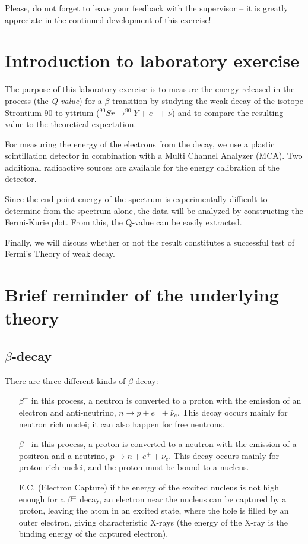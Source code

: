 \documentclass[a4,11pt, notitlepage]{article}
\begin{document}
Please, do not forget to leave your feedback with the supervisor -- it
is greatly appreciate in the continued development of this exercise!

\pagebreak
\section{Introduction to laboratory exercise}

The purpose of this laboratory exercise is to measure the energy
released in the process (the \textit{Q-value}) for a
$\beta$-transition by studying the weak decay of the isotope
Strontium-90 to yttrium ($^{90}Sr\rightarrow ^{90}Y + e^- + \bar{\nu}$) and to compare the
resulting value to the theoretical expectation. 

For measuring the energy of the electrons from the decay, we use a
plastic scintillation detector in combination with a Multi Channel
Analyzer (MCA). Two additional radioactive sources are available for
the energy calibration of the detector.

Since the end point energy of the spectrum is experimentally difficult
to determine from the spectrum alone, the data will be analyzed by
constructing the Fermi-Kurie plot. From this, the Q-value can be
easily extracted.

Finally, we will discuss whether or not the result constitutes a
successful test of Fermi's Theory of weak decay.

\section{Brief reminder of the underlying theory}
\subsection{$\beta$-decay}

There are three different kinds of $\beta$ decay:
\begin{itemize}
\item[$\beta^-$] in this process, a neutron is converted to a proton
  with the emission of an electron and anti-neutrino,
  $n\rightarrow p + e^- + \bar \nu_e$. This decay occurs mainly for
  neutron rich nuclei; it can also happen for free neutrons.
\item[$\beta^+$] in this process, a proton is converted to a neutron
  with the emission of a positron and a neutrino,
  $p\rightarrow n + e^+ + \nu_e$. This decay occurs mainly for
  proton rich nuclei, and the proton must be bound to a nucleus.
\item[E.C.] (Electron Capture) if the energy of the excited nucleus is
  not high enough for a $\beta^{\pm}$ decay, an electron near the
  nucleus can be captured by a proton, leaving the atom in an excited
  state, where the hole is filled by an outer electron, giving
  characteristic X-rays (the energy of the X-ray is the binding energy
  of the captured electron).
\end{itemize}
\end{document}
